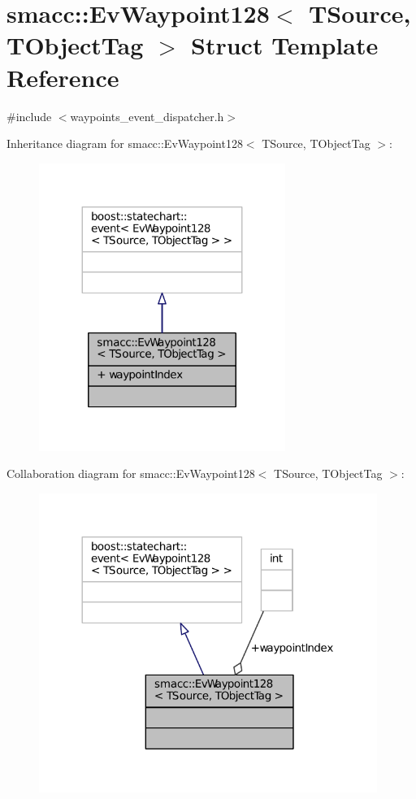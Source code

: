 \hypertarget{structsmacc_1_1EvWaypoint128}{}\section{smacc\+:\+:Ev\+Waypoint128$<$ T\+Source, T\+Object\+Tag $>$ Struct Template Reference}
\label{structsmacc_1_1EvWaypoint128}


{\ttfamily \#include $<$waypoints\+\_\+event\+\_\+dispatcher.\+h$>$}



Inheritance diagram for smacc\+:\+:Ev\+Waypoint128$<$ T\+Source, T\+Object\+Tag $>$\+:
\nopagebreak
\begin{figure}[H]
\begin{center}
\leavevmode
\includegraphics[width=227pt]{structsmacc_1_1EvWaypoint128__inherit__graph}
\end{center}
\end{figure}


Collaboration diagram for smacc\+:\+:Ev\+Waypoint128$<$ T\+Source, T\+Object\+Tag $>$\+:
\nopagebreak
\begin{figure}[H]
\begin{center}
\leavevmode
\includegraphics[width=312pt]{structsmacc_1_1EvWaypoint128__coll__graph}
\end{center}
\end{figure}

